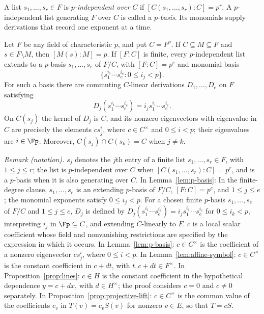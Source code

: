 A list $s_1,\ldots,s_r\in F$ is \emph{$p$-independent over $C$} if
$[C(s_1,\ldots,s_r):C]=p^r$.  A $p$-independent list generating $F$ over
$C$ is called a \emph{$p$-basis}.  Its monomials supply derivations that
record one exponent at a time.

\begin{lemma}\label{lem:p-basis}
Let $F$ be any field of characteristic $p$, and put $C=F^p$.
If $C\subseteq M\subseteq F$ and $s\in F\setminus M$, then
$[M(s):M]=p$.  If $[F:C]$ is finite, every $p$-independent list extends to a $p$-basis
$s_1,\ldots,s_e$ of $F/C$, with $[F:C]=p^e$ and monomial basis
\[
 \{s_1^{i_1}\cdots s_e^{i_e}:0\leq i_j<p\}.
\]
For such a basis there are commuting $C$-linear derivations
$D_1,\ldots,D_e$ on $F$ satisfying
\[
 D_j(s_1^{i_1}\cdots s_e^{i_e})
       =i_j s_1^{i_1}\cdots s_e^{i_e}.
\]
On $C(s_j)$ the kernel of $D_j$ is $C$, and its nonzero eigenvectors with
eigenvalue in $C$ are precisely the elements $c s_j^i$, where
$c\in C^\times$ and $0\leq i<p$; their eigenvalues are $i\in\Fp$.
Moreover, $C(s_j)\cap C(s_k)=C$ when $j\ne k$.
\end{lemma}

\noindent\textit{Remark (notation).} $s_j$ denotes the $j$th entry of a finite list $s_1,\ldots,s_r\in F$, with $1\leq j\leq r$; the list is $p$-independent over $C$ when $[C(s_1,\ldots,s_r):C]=p^r$, and is a $p$-basis when it is also generating over $C$. In Lemma~\ref{lem:p-basis}: In the finite-degree clause, $s_1,\ldots,s_e$ is an extending $p$-basis of $F/C$, $[F:C]=p^e$, and $1\leq j\leq e$; the monomial exponents satisfy $0\leq i_j<p$. For a chosen finite $p$-basis $s_1,\ldots,s_e$ of $F/C$ and $1\leq j\leq e$, $D_j$ is defined by $D_j(s_1^{i_1}\cdots s_e^{i_e})=i_j s_1^{i_1}\cdots s_e^{i_e}$ for $0\leq i_k<p$, interpreting $i_j$ in $\Fp\subseteq C$, and extending $C$-linearly to $F$. $c$ is a local scalar coefficient whose field and nonvanishing restrictions are specified by the expression in which it occurs. In Lemma~\ref{lem:p-basis}: $c\in C^\times$ is the coefficient of a nonzero eigenvector $c s_j^i$, where $0\leq i<p$. In Lemma~\ref{lem:affine-symbol}: $c\in C^\times$ is the constant coefficient in $c+dt$, with $t,c+dt\in F^\times$. In Proposition~\ref{prop:lines}: $c\in H$ is the constant coefficient in the hypothetical dependence $y=c+dx$, with $d\in H^\times$; the proof considers $c=0$ and $c\ne0$ separately. In Proposition~\ref{prop:projective-lift}: $c\in C^\times$ is the common value of the coefficients $c_v$ in $T(v)=c_vS(v)$ for nonzero $v\in E$, so that $T=cS$.


